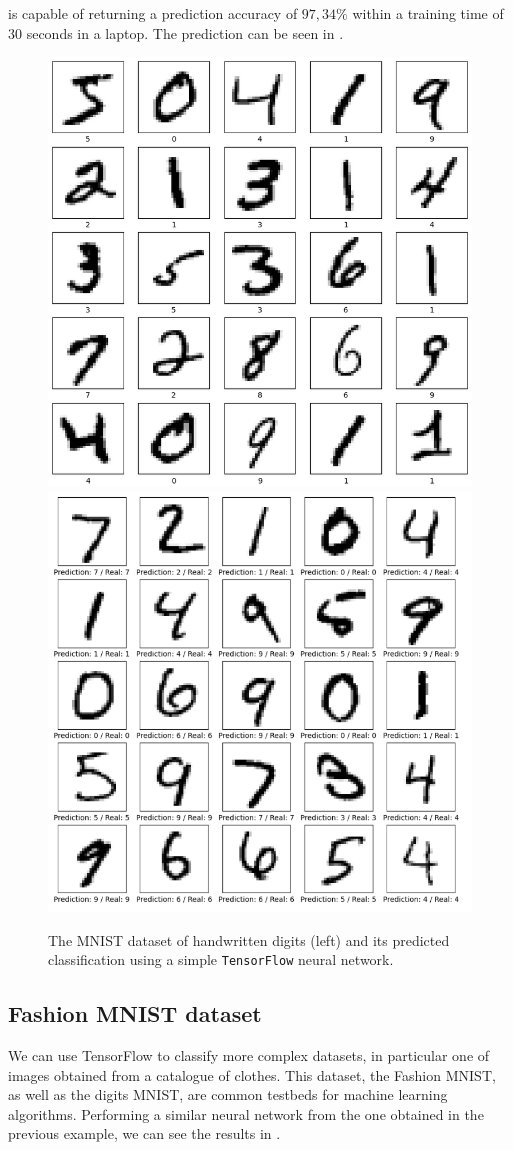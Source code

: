 \documentclass[]{report}
\begin{document}
is capable of returning a prediction accuracy of $97,34\%$ within a training time of 30 seconds in a laptop. The prediction can be seen in . 

\begin{figure}\centering
\includegraphics[width = .475\linewidth]{images/mnist}
\includegraphics[width = .475\linewidth]{images/prediction-mnist}
\caption{The MNIST dataset of handwritten digits (left) and its predicted classification using a simple \texttt{TensorFlow} neural network.}
\label{fig.mnist}
\end{figure}

\subsection{Fashion MNIST dataset}

We can use TensorFlow to classify more complex datasets, in particular one of images obtained from a catalogue of clothes. This dataset, the Fashion MNIST, as well as the digits MNIST, are common testbeds for machine learning algorithms. Performing a similar neural network from the one obtained in the previous example, we can see the results in . 
\end{document}
